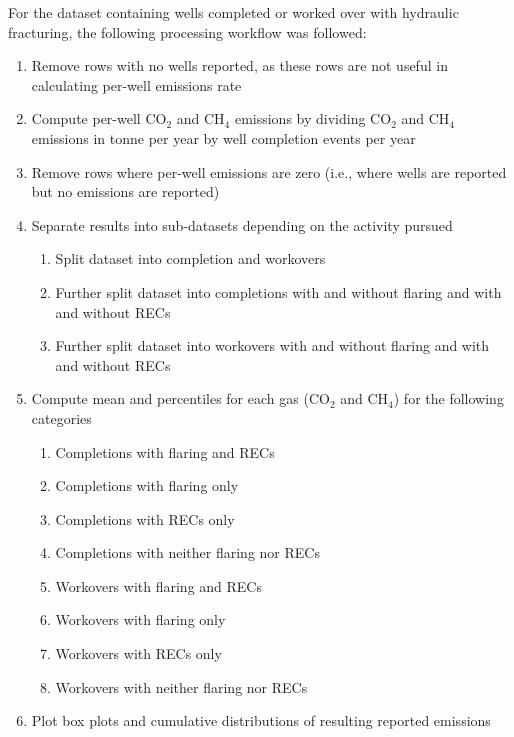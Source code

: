\documentclass[11pt]{report}
\begin{document}
{{{{For the dataset containing wells completed or worked over with hydraulic fracturing, the following processing workflow was followed:
\begin{enumerate}
\item Remove rows with no wells reported, as these rows are not useful in calculating per-well emissions rate	
\item Compute per-well CO$_2$ and CH$_4$ emissions by dividing CO$_2$ and CH$_4$ emissions in tonne per year by well completion events per year	
\item Remove rows where per-well emissions are zero (i.e., where wells are reported but no emissions are reported)	
\item Separate results into sub-datasets depending on the activity pursued	
	\begin{enumerate}
	\item Split dataset into completion and workovers
	\item Further split dataset into completions with and without flaring and with and without RECs
	\item Further split dataset into workovers with and without flaring and with and without RECs
	\end{enumerate}
\item Compute mean and percentiles for each gas (CO$_2$ and CH$_4$) for the following categories	
	\begin{enumerate}
	\item Completions with flaring and RECs
	\item Completions with flaring only
	\item Completions with RECs only
	\item Completions with neither flaring nor RECs
	\item Workovers with flaring and RECs
	\item Workovers with flaring only
	\item Workovers with RECs only
	\item Workovers with neither flaring nor RECs
	\end{enumerate}
\item Plot box plots and cumulative distributions of resulting reported emissions	
\end{enumerate}


}}}}
\end{document}
